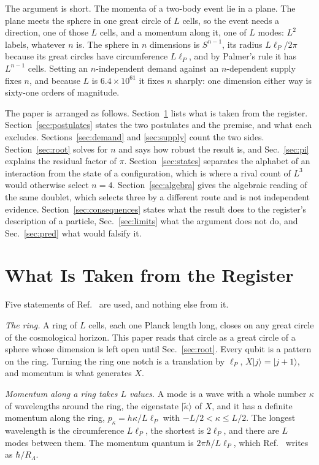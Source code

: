 \documentclass[aps,prd,twocolumn,superscriptaddress,nofootinbib]{revtex4-2}
\begin{document}
The argument is short. The momenta of a two-body event lie in a plane. The plane meets the sphere in one great circle of $L$ cells, so the event needs a direction, one of those $L$ cells, and a momentum along it, one of $L$ modes: $L^2$ labels, whatever $n$ is. The sphere in $n$ dimensions is $S^{n-1}$, its radius $L\ell_P/2\pi$ because its great circles have circumference $L\ell_P$, and by Palmer's rule it has $L^{n-1}$ cells. Setting an $n$-independent demand against an $n$-dependent supply fixes $n$, and because $L$ is $6.4\times10^{61}$ it fixes $n$ sharply: one dimension either way is sixty-one orders of magnitude.

The paper is arranged as follows. Section~\ref{sec:register} lists what is taken from the register. Section~\ref{sec:postulates} states the two postulates and the premise, and what each excludes. Sections~\ref{sec:demand} and \ref{sec:supply} count the two sides. Section~\ref{sec:root} solves for $n$ and says how robust the result is, and Sec.~\ref{sec:pi} explains the residual factor of $\pi$. Section~\ref{sec:states} separates the alphabet of an interaction from the state of a configuration, which is where a rival count of $L^3$ would otherwise select $n = 4$. Section~\ref{sec:algebra} gives the algebraic reading of the same doublet, which selects three by a different route and is not independent evidence. Section~\ref{sec:consequences} states what the result does to the register's description of a particle, Sec.~\ref{sec:limits} what the argument does not do, and Sec.~\ref{sec:pred} what would falsify it.

\section{What Is Taken from the Register}
\label{sec:register}

Five statements of Ref.~\cite{korytko2026c} are used, and nothing else from it.

\textit{The ring.} A ring of $L$ cells, each one Planck length long, closes on any great circle of the cosmological horizon. This paper reads that circle as a great circle of a sphere whose dimension is left open until Sec.~\ref{sec:root}. Every qubit is a pattern on the ring. Turning the ring one notch is a translation by $\ell_P$, $X|j\rangle = |j+1\rangle$, and momentum is what generates $X$.

\textit{Momentum along a ring takes $L$ values.} A mode is a wave with a whole number $\kappa$ of wavelengths around the ring, the eigenstate $|\tilde\kappa\rangle$ of $X$, and it has a definite momentum along the ring, $p_\kappa = h\kappa/L\ell_P$ with $-L/2 < \kappa \le L/2$. The longest wavelength is the circumference $L\ell_P$, the shortest is $2\ell_P$, and there are $L$ modes between them. The momentum quantum is $2\pi\hbar/L\ell_P$, which Ref.~\cite{korytko2026c} writes as $\hbar/R_\Lambda$.
\end{document}
